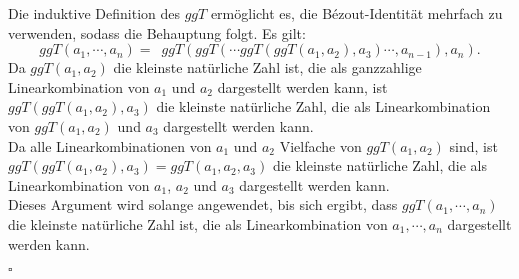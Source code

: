 \documentclass[12pt]{article}
\newcommand{\QED}{\begin{flushright} $\square$ \end{flushright}}
\begin{document}
Die induktive Definition des $ggT$ ermöglicht es, die Bézout-Identität mehrfach zu verwenden, sodass die Behauptung folgt. Es gilt:
$$ggT(a_1, \cdots, a_n) = \enspace ggT(ggT( \cdots ggT(ggT(a_1, a_2), a_3) \cdots, a_{n-1}), a_n).$$
Da $ggT(a_1, a_2)$ die kleinste natürliche Zahl ist, die als ganzzahlige Linearkombination von $a_1$ und $a_2$ dargestellt werden kann, ist $ggT(ggT(a_1, a_2), a_3)$ die kleinste natürliche Zahl, die als Linearkombination von $ggT(a_1, a_2)$ und $a_3$ dargestellt werden kann. \\
Da alle Linearkombinationen von $a_1$ und $a_2$ Vielfache von $ggT(a_1, a_2)$ sind, ist $ggT(ggT(a_1, a_2), a_3) = ggT(a_1, a_2, a_3)$ die kleinste natürliche Zahl, die als Linearkombination von $a_1$, $a_2$ und $a_3$ dargestellt werden kann. \\
Dieses Argument wird solange angewendet, bis sich ergibt, dass $ggT(a_1, \cdots, a_n)$ die kleinste natürliche Zahl ist, die als Linearkombination von $a_1, \cdots, a_n$ dargestellt werden kann.
\QED
\end{document}

